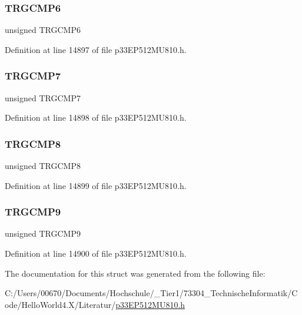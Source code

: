 \subsubsection{\texorpdfstring{T\+R\+G\+C\+M\+P6}{TRGCMP6}}
{\footnotesize\ttfamily unsigned T\+R\+G\+C\+M\+P6}



Definition at line 14897 of file p33\+E\+P512\+M\+U810.\+h.

\mbox{\label{structtag_t_r_i_g4_b_i_t_s_aa801131b5ab0b542a360d202275ea4fd}} 
\subsubsection{\texorpdfstring{T\+R\+G\+C\+M\+P7}{TRGCMP7}}
{\footnotesize\ttfamily unsigned T\+R\+G\+C\+M\+P7}



Definition at line 14898 of file p33\+E\+P512\+M\+U810.\+h.

\mbox{\label{structtag_t_r_i_g4_b_i_t_s_a7d4f3ec40334f00592eb7247457e2fd6}} 
\subsubsection{\texorpdfstring{T\+R\+G\+C\+M\+P8}{TRGCMP8}}
{\footnotesize\ttfamily unsigned T\+R\+G\+C\+M\+P8}



Definition at line 14899 of file p33\+E\+P512\+M\+U810.\+h.

\mbox{\label{structtag_t_r_i_g4_b_i_t_s_a0001e7efb9031bef24e7a19100d11b0b}} 
\subsubsection{\texorpdfstring{T\+R\+G\+C\+M\+P9}{TRGCMP9}}
{\footnotesize\ttfamily unsigned T\+R\+G\+C\+M\+P9}



Definition at line 14900 of file p33\+E\+P512\+M\+U810.\+h.



The documentation for this struct was generated from the following file\+:\begin{DoxyCompactItemize}
\item 
C\+:/\+Users/00670/\+Documents/\+Hochschule/\+\_\+\+Tier1/73304\+\_\+\+Technische\+Informatik/\+Code/\+Hello\+World4.\+X/\+Literatur/\hyperlink{p33_e_p512_m_u810_8h}{p33\+E\+P512\+M\+U810.\+h}\end{DoxyCompactItemize}
